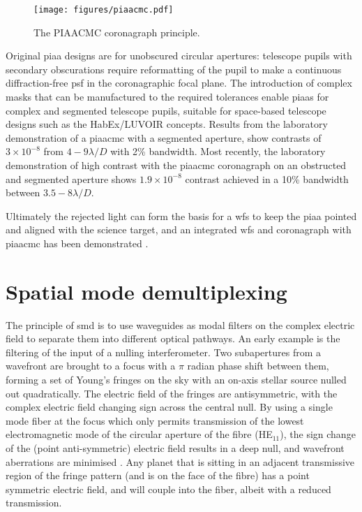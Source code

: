 \documentclass[letterpaper]{ar-1col}
\newcommand{\ld}{$\lambda/D$}
\begin{document}
\begin{figure}[ht]
  \centering
  \texttt{[image: figures/piaacmc.pdf]}
  \caption{The PIAACMC coronagraph principle.}
  \label{fig:piaatypes}
\end{figure}

Original \ac{piaa} designs are for unobscured circular apertures: telescope pupils with secondary obscurations require reformatting of the pupil to make a continuous diffraction-free \ac{psf} in the coronagraphic focal plane.
%
The introduction of complex masks that can be manufactured to the required tolerances enable \ac{piaa}s for complex and segmented telescope pupils, suitable for space-based telescope designs such as the HabEx/LUVOIR concepts.
%
Results from the laboratory demonstration of a \ac{piaacmc} with a segmented aperture, \citet{Marx21} show contrasts of $3\times 10^{-8}$ from $4-9$\ld{} with 2\% bandwidth.
%
Most recently, the laboratory demonstration of high contrast with the \ac{piaacmc} coronagraph on an obstructed and segmented aperture \citep{Belikov22} shows $1.9\times 10^{-8}$ contrast achieved in a 10\% bandwidth between $3.5-8$\ld{}.

Ultimately the rejected light can form the basis for a \ac{wfs} to keep the \ac{piaa} pointed and aligned with the science target, and an integrated \ac{wfs} and coronagraph with \ac{piaacmc} has been demonstrated \citep{Haffert23a}.

\section{Spatial mode demultiplexing}

The principle of \ac{smd} is to use waveguides as modal filters on the complex electric field to separate them into different optical pathways.
%
An early example is the filtering of the input of a nulling interferometer.
%
Two subapertures from a wavefront are brought to a focus with a $\pi$ radian phase shift between them, forming a set of Young's fringes on the sky with an on-axis stellar source nulled out quadratically.
%
The electric field of the fringes are antisymmetric, with the complex electric field changing sign across the central null.
%
By using a single mode fiber at the focus  which only permits transmission of the lowest electromagnetic mode of the circular aperture of the fibre (HE$_{11}$), the sign change of the (point anti-symmetric) electric field results in a deep null, and wavefront aberrations are minimised \citet{Serabyn06,Haguenauer06}.
%
Any planet that is sitting in an adjacent transmissive region of the fringe pattern (and is on the face of the fibre) has a point symmetric electric field, and will couple into the fiber, albeit with a reduced transmission.
\end{document}
